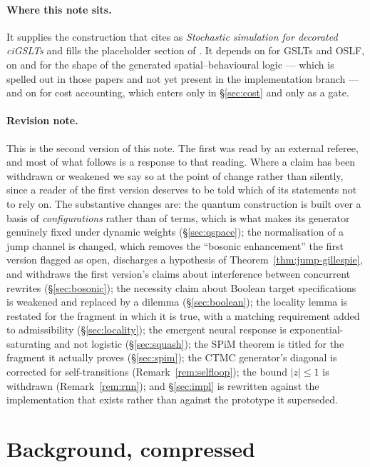 \documentclass[11pt,a4paper]{article}
\theoremstyle{plain}
\theoremstyle{definition}
\theoremstyle{remark}
\begin{document}
\paragraph{Where this note sits.} It supplies the construction that \cite{scientist} cites as
\emph{Stochastic simulation for decorated ciGSLTs} and fills the placeholder section of
\cite{mettacalc}. It depends on \cite{omnibus} for GSLTs and OSLF, on \cite{classifier} and
\cite{scientist} for the shape of the generated spatial--behavioural logic --- which is spelled out
in those papers and not yet present in the implementation branch --- and on \cite{costmonad} for
cost accounting, which enters only in \S\ref{sec:cost} and only as a gate.

\paragraph{Revision note.} This is the second version of this note. The first was read by an external
referee, and most of what follows is a response to that reading. Where a claim has been withdrawn or
weakened we say so at the point of change rather than silently, since a reader of the first version
deserves to be told which of its statements not to rely on. The substantive changes are: the quantum
construction is built over a basis of \emph{configurations} rather than of terms, which is what makes
its generator genuinely fixed under dynamic weights (\S\ref{sec:qspace}); the normalisation of a jump
channel is changed, which removes the ``bosonic enhancement'' the first version flagged as open,
discharges a hypothesis of Theorem~\ref{thm:jump-gillespie}, and withdraws the first version's claims
about interference between concurrent rewrites (\S\ref{sec:bosonic}); the necessity claim about
Boolean target specifications is weakened and replaced by a dilemma (\S\ref{sec:boolean}); the
locality lemma is restated for the fragment in which it is true, with a matching requirement added to
admissibility (\S\ref{sec:locality}); the emergent neural response is exponential-saturating and not
logistic (\S\ref{sec:squash}); the SPiM theorem is titled for the fragment it actually proves
(\S\ref{sec:spim}); the CTMC generator's diagonal is corrected for self-transitions
(Remark~\ref{rem:selfloop}); the bound $|z| \le 1$ is withdrawn (Remark~\ref{rem:rnn}); and
\S\ref{sec:impl} is rewritten against the implementation that exists rather than against the
prototype it superseded.

\section{Background, compressed}
\label{sec:background}
\end{document}
